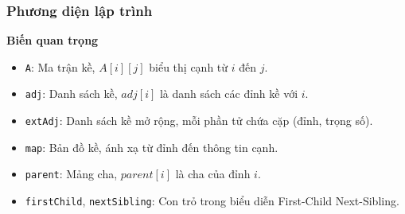 \documentclass[a4paper,12pt]{article}
\begin{document}
\subsubsection{Phương diện lập trình}

\textbf{Biến quan trọng}
\begin{itemize}
    \item \texttt{A}: Ma trận kề, \( A[i][j] \) biểu thị cạnh từ \( i \) đến \( j \).
    \item \texttt{adj}: Danh sách kề, \( adj[i] \) là danh sách các đỉnh kề với \( i \).
    \item \texttt{extAdj}: Danh sách kề mở rộng, mỗi phần tử chứa cặp (đỉnh, trọng số).
    \item \texttt{map}: Bản đồ kề, ánh xạ từ đỉnh đến thông tin cạnh.
    \item \texttt{parent}: Mảng cha, \( parent[i] \) là cha của đỉnh \( i \).
    \item \texttt{firstChild}, \texttt{nextSibling}: Con trỏ trong biểu diễn First-Child Next-Sibling.
\end{itemize}
\end{document}
